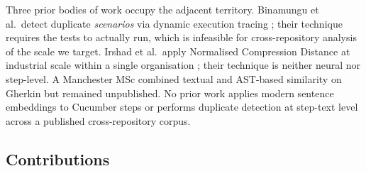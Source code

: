 \documentclass[11pt,a4paper]{article}
\begin{document}
Three prior bodies of work occupy the adjacent territory. Binamungu et
al.\ detect duplicate \emph{scenarios} via dynamic execution tracing
\citep{binamungu2018vst,binamungu2018saner,binamungu2020xp,binamungu2020phd};
their technique requires the tests to actually run, which is infeasible
for cross-repository analysis of the scale we target. Irshad et al.\
apply Normalised Compression Distance at industrial scale within a
single organisation \citep{irshad2020ease,irshad2021jss,irshad2022ist};
their technique is neither neural nor step-level. A Manchester MSc
\citep{suan2015msc} combined textual and AST-based similarity on Gherkin
but remained unpublished. No prior work applies modern sentence
embeddings to Cucumber steps or performs duplicate detection at
step-text level across a published cross-repository corpus.

\subsection*{Contributions}
\end{document}
